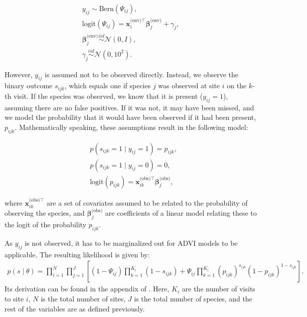 \begin{align}
y_{ij} \sim \textrm{Bern}(\Psi_{ij}), \\
  \textrm{logit}(\Psi_{ij}) = \bm{x}^{\text{(env)}\intercal}_i \bm{\beta}^{\text{(env)}}_j + \gamma_j, \\
  \bm{\beta}^{\text{(env)}}_j \stackrel{iid}{\sim} \mathcal{N}(0, I), \\
  \gamma_j \stackrel{iid}{\sim} \mathcal{N}(0, 10^2).
\end{align}

However, $y_{ij}$ is assumed not to be observed directly. Instead, we observe
the binary outcome $s_{ijk}$, which equals one if species $j$ was observed at
site $i$ on the $k$-th visit. If the species was observed, we know that it is
present ($y_{ij} = 1$), assuming there are no false positives. If it was not, it
may have been missed, and we model the probability that it would have been
observed if it had been present, $p_{ijk}$. Mathematically speaking, these
assumptions result in the following model:

\begin{align}
  & p(s_{ijk} = 1 \mid y_{ij} = 1) = p_{ijk}, \label{eq:det-prob} \\
  & p(s_{ijk} = 1 \mid y_{ij} = 0) = 0, \label{eq:false-pos} \\
  & \textrm{logit}(p_{ijk}) = \bm{x}_{ik}^{\text{(obs)}\intercal} \bm{\beta}^{\text{(obs)}}_j \label{eq:det-prob-model},
\end{align}

where $\bm{x}_{ik}^{\text{(obs)}\intercal}$ are a set of covariates assumed to
be related to the probability of observing the species, and
$\bm{\beta}^{\text{(obs)}}_j$ are coefficients of a linear model relating these
to the logit of the probability $p_{ijk}$.

As $y_{ij}$ is not observed, it has to be marginalized out for ADVI models to be
applicable. The resulting likelihood is given by:
%
\begin{align}
  p(s \mid \theta) = \prod_{i=1}^{N} \prod_{j=1}^{J} \left[(1 - \Psi_{ij}) \prod_{k=1}^{K_i} (1 - s_{ijk}) +
  \Psi_{ij} \prod_{k=1}^{K_i} (p_{ijk})^{s_{ijk}} (1 - p_{ijk})^{1 - s_{ijk}} \right].
  \label{eq:observed-data-likelihood}
\end{align}
%
Its derivation can be found in the appendix of \cite{ingram:2022:occupancy}.
Here, $K_i$ are the number of visits to site $i$, $N$ is the total number of
sites, $J$ is the total number of species, and the rest of the variables are as
defined previously.
